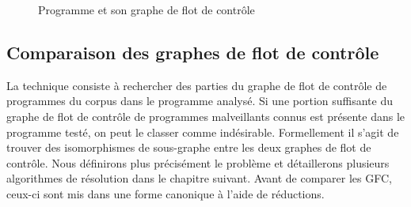 \begin{figure}[h]
\begin{center}
\end{center}
\caption{Programme et son graphe de flot de contrôle}
\label{fig:am_prog}
\end{figure}



\subsection{Comparaison des graphes de flot de contrôle}
La technique consiste à rechercher des parties du graphe de flot de contrôle de programmes du corpus dans le programme analysé.
Si une portion suffisante du graphe de flot de contrôle de programmes malveillants connus est présente dans le programme testé, on peut le classer comme indésirable. Formellement il s'agit de trouver des isomorphismes de sous-graphe entre les deux graphes de flot de contrôle. Nous définirons plus précisément le problème et détaillerons plusieurs algorithmes de résolution dans le chapitre suivant. Avant de comparer les GFC, ceux-ci sont mis dans une forme canonique à l'aide de réductions.

